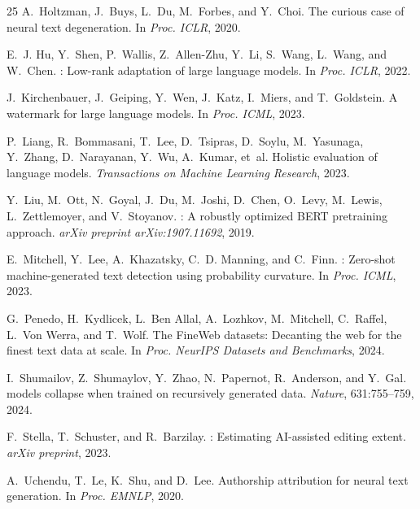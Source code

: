 \documentclass[11pt,a4paper]{article}
\begin{document}
\begin{thebibliography}{25}
A.~Holtzman, J.~Buys, L.~Du, M.~Forbes, and Y.~Choi.
\newblock The curious case of neural text degeneration.
\newblock In \emph{Proc. ICLR}, 2020.

E.~J. Hu, Y.~Shen, P.~Wallis, Z.~Allen-Zhu, Y.~Li, S.~Wang, L.~Wang, and W.~Chen.
: Low-rank adaptation of large language models.
\newblock In \emph{Proc. ICLR}, 2022.

J.~Kirchenbauer, J.~Geiping, Y.~Wen, J.~Katz, I.~Miers, and T.~Goldstein.
\newblock A watermark for large language models.
\newblock In \emph{Proc. ICML}, 2023.

P.~Liang, R.~Bommasani, T.~Lee, D.~Tsipras, D.~Soylu, M.~Yasunaga, Y.~Zhang, D.~Narayanan, Y.~Wu, A.~Kumar, et~al.
\newblock Holistic evaluation of language models.
\newblock \emph{Transactions on Machine Learning Research}, 2023.

Y.~Liu, M.~Ott, N.~Goyal, J.~Du, M.~Joshi, D.~Chen, O.~Levy, M.~Lewis, L.~Zettlemoyer, and V.~Stoyanov.
: A robustly optimized {BERT} pretraining approach.
\newblock \emph{arXiv preprint arXiv:1907.11692}, 2019.

E.~Mitchell, Y.~Lee, A.~Khazatsky, C.~D. Manning, and C.~Finn.
: Zero-shot machine-generated text detection using probability curvature.
\newblock In \emph{Proc. ICML}, 2023.

G.~Penedo, H.~Kydlicek, L.~{Ben Allal}, A.~Lozhkov, M.~Mitchell, C.~Raffel, L.~{Von Werra}, and T.~Wolf.
\newblock The {FineWeb} datasets: Decanting the web for the finest text data at scale.
\newblock In \emph{Proc. NeurIPS Datasets and Benchmarks}, 2024.

I.~Shumailov, Z.~Shumaylov, Y.~Zhao, N.~Papernot, R.~Anderson, and Y.~Gal.
 models collapse when trained on recursively generated data.
\newblock \emph{Nature}, 631:755--759, 2024.

F.~Stella, T.~Schuster, and R.~Barzilay.
: Estimating {AI}-assisted editing extent.
\newblock \emph{arXiv preprint}, 2023.

A.~Uchendu, T.~Le, K.~Shu, and D.~Lee.
\newblock Authorship attribution for neural text generation.
\newblock In \emph{Proc. EMNLP}, 2020.


\end{thebibliography}
\end{document}
